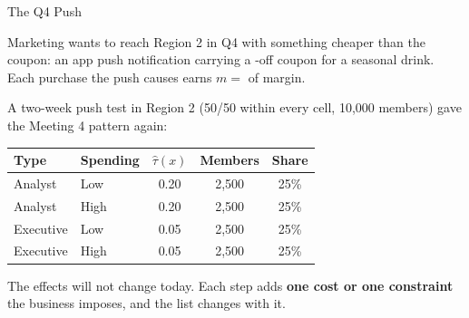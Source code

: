 \documentclass[aspectratio=169, 11pt, handout]{beamer}
\newcommand{\hatt}{\hat{\tau}}
\begin{document}
\begin{frame}{The Q4 Push}

Marketing wants to reach Region 2 in Q4 with something cheaper than the  coupon: an app push notification carrying a -off coupon for a seasonal drink. Each purchase the push causes earns $m = $  of margin.

\bigskip

A two-week push test in Region 2 (50/50 within every cell, 10{,}000 members) gave the Meeting 4 pattern again:

\begin{center}
\small
\begin{tabular}{llccc}
\toprule
\textbf{Type} & \textbf{Spending} & $\hatt(x)$ & \textbf{Members} & \textbf{Share} \\
\midrule
Analyst   & Low  & 0.20 & 2{,}500 & 25\% \\
Analyst   & High & 0.20 & 2{,}500 & 25\% \\
Executive & Low  & 0.05 & 2{,}500 & 25\% \\
Executive & High & 0.05 & 2{,}500 & 25\% \\
\bottomrule
\end{tabular}
\end{center}

\bigskip

The effects will not change today. Each step adds \textbf{one cost or one constraint} the business imposes, and the list changes with it.
\end{frame}
\end{document}
